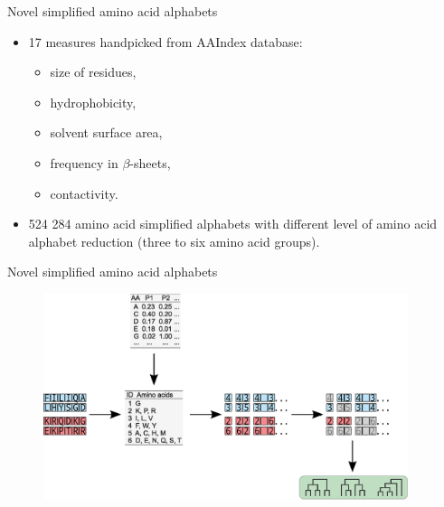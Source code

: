 \documentclass{beamer}\usepackage[]{graphicx}\usepackage[]{color}
\begin{document}
\begin{frame}{Novel simplified amino acid alphabets}

\begin{itemize}
\item 17 measures handpicked from AAIndex database: 
  \begin{itemize}
    \item size of residues, 
    \item hydrophobicity, 
    \item solvent surface area, 
    \item frequency in $\beta$-sheets,
    \item contactivity.
  \end{itemize}
  \item 524 284 amino acid simplified alphabets with different level of amino acid alphabet reduction (three to six amino acid groups).
  \end{itemize}

    \end{frame}
  
    \begin{frame}{Novel simplified amino acid alphabets}
\begin{figure} 
\includegraphics[width=0.95\textwidth]{static_figure/ngram3.eps}
\end{figure}
  \end{frame}
\end{document}
